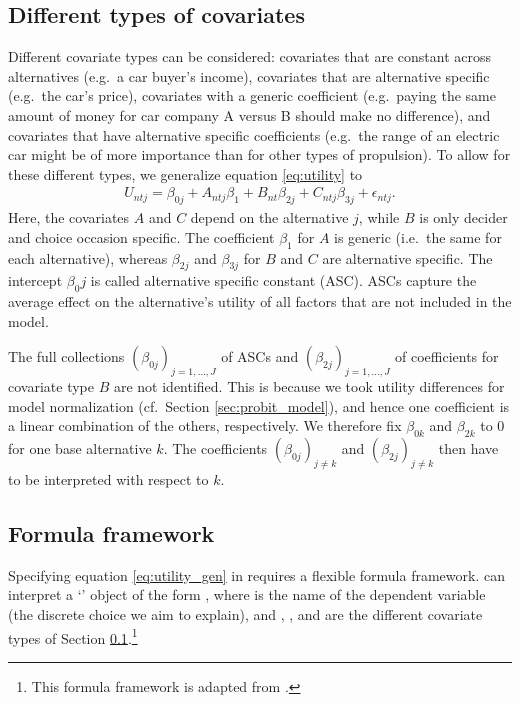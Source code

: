 \documentclass[article,shortnames]{jss}
\newcommand{\class}[1]{`\code{#1}'}
\begin{document}
\subsection{Different types of covariates} \label{subsec:covariate_types}

Different covariate types can be considered: covariates that are constant across alternatives (e.g.\ a car buyer's income), covariates that are alternative specific (e.g.\ the car's price), covariates with a generic coefficient (e.g.\ paying the same amount of money for car company A versus B should make no difference), and covariates that have alternative specific coefficients (e.g.\ the range of an electric car might be of more importance than for other types of propulsion). To allow for these different types, we generalize equation \eqref{eq:utility} to
\begin{align}
  \label{eq:utility_gen}
  U_{ntj} = \beta_{0j} + A_{ntj} \beta_1 + B_{nt} \beta_{2j} + C_{ntj} \beta_{3j} + \epsilon_{ntj}.
\end{align}
Here, the covariates $A$ and $C$ depend on the alternative $j$, while $B$ is only decider and choice occasion specific. The coefficient $\beta_1$ for $A$ is generic (i.e.\ the same for each alternative), whereas $\beta_{2j}$ and $\beta_{3j}$ for $B$ and $C$ are alternative specific. The intercept $\beta_0j$ is called alternative specific constant (ASC). ASCs capture the average effect on the alternative's utility of all factors that are not included in the model.

The full collections $(\beta_{0j})_{j=1,\dots,J}$ of ASCs and $(\beta_{2j})_{j=1,\dots,J}$ of coefficients for covariate type $B$ are not identified. This is because we took utility differences for model normalization (cf.\ Section \ref{sec:probit_model}), and hence one coefficient is a linear combination of the others, respectively. We therefore fix $\beta_{0k}$ and $\beta_{2k}$ to 0 for one base alternative $k$. The coefficients $(\beta_{0j})_{j\neq k}$ and $(\beta_{2j})_{j\neq k}$ then have to be interpreted with respect to $k$.

\subsection{Formula framework} \label{subsec:formula}

Specifying equation \eqref{eq:utility_gen} in  requires a flexible formula framework.  can interpret a \class{formula} object of the form , where  is the name of the dependent variable (the discrete choice we aim to explain), and , , and  are the different covariate types of Section \ref{subsec:covariate_types}.\footnote{This formula framework is adapted from .}
\end{document}
